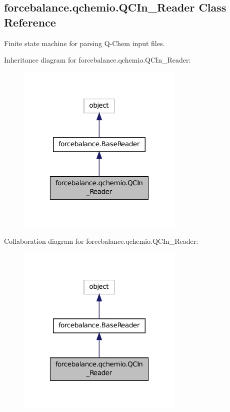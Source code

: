 \hypertarget{classforcebalance_1_1qchemio_1_1QCIn__Reader}{\subsection{forcebalance.\-qchemio.\-Q\-C\-In\-\_\-\-Reader Class Reference}
\label{classforcebalance_1_1qchemio_1_1QCIn__Reader}
}


Finite state machine for parsing Q-\/\-Chem input files.  




Inheritance diagram for forcebalance.\-qchemio.\-Q\-C\-In\-\_\-\-Reader\-:\nopagebreak
\begin{figure}[H]
\begin{center}
\leavevmode
\includegraphics[width=226pt]{classforcebalance_1_1qchemio_1_1QCIn__Reader__inherit__graph}
\end{center}
\end{figure}


Collaboration diagram for forcebalance.\-qchemio.\-Q\-C\-In\-\_\-\-Reader\-:\nopagebreak
\begin{figure}[H]
\begin{center}
\leavevmode
\includegraphics[width=226pt]{classforcebalance_1_1qchemio_1_1QCIn__Reader__coll__graph}
\end{center}
\end{figure}
